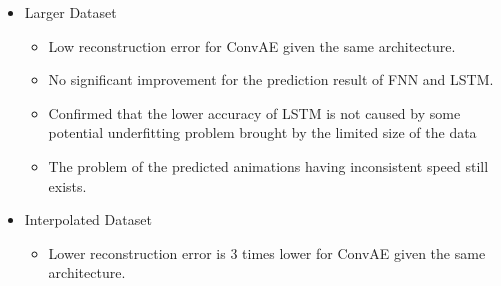 {\begin{itemize}
\begin{itemize}
            \item FNN has low loss value when predicting the next temperature field given a total of 3 hidden layers. However, when predicting a complete simulation using FNN:
            
            \begin{itemize}
                \item output-as-input prediction fails to capture the trend of simulation in its worst case and the prediction result is completely different to the actual simulations
            
                \item while the second method mostly matches with the actual output even in its worst case.
            
            \end{itemize}

            \item LSTM has a higher loss value than FNN, but is able to capture the characteristic of the simulation more precisely

            \item predicted animations generated by FNN and LSTM are either moving faster or slower than the actual simulations
            
        \end{itemize}
        
    \item Larger Dataset
        \begin{itemize}
            \item Low reconstruction error for ConvAE given the same architecture.

            \item No significant improvement for the prediction result of FNN and LSTM.

            \item Confirmed that the lower accuracy of LSTM is not caused by some potential underfitting problem brought by the limited size of the data
            
            \item The problem of the predicted animations having inconsistent speed still exists.
            
        \end{itemize}

        
    \item Interpolated Dataset
    
    \begin{itemize}
            \item Lower reconstruction error is 3 times lower for ConvAE given the same architecture.


\end{itemize}
\end{itemize}}
